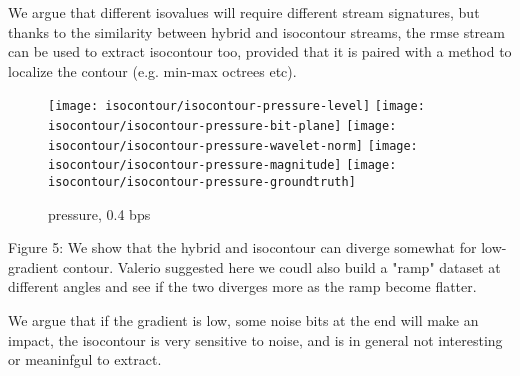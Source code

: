 We argue that different isovalues will require different stream signatures, but thanks to the
similarity between hybrid and isocontour streams, the rmse stream can be used to extract isocontour
too, provided that it is paired with a method to localize the contour (e.g. min-max octrees etc).

\begin{figure}[h]
	\centering
	{\texttt{[image: isocontour/isocontour-pressure-level]}}
	{\texttt{[image: isocontour/isocontour-pressure-bit-plane]}}
	{\texttt{[image: isocontour/isocontour-pressure-wavelet-norm]}}
	{\texttt{[image: isocontour/isocontour-pressure-magnitude]}}
	{\texttt{[image: isocontour/isocontour-pressure-groundtruth]}}
	\caption{pressure, 0.4 bps}
	\label{fig:isocontour-plots}
\end{figure}
Figure 5: We show that the hybrid and isocontour can diverge somewhat for low-gradient contour.
Valerio suggested here we coudl also build a "ramp" dataset at different angles and see if the two
diverges more as the ramp become flatter.

We argue that if the gradient is low, some noise bits at the end will make an impact, the isocontour
is very sensitive to noise, and is in general not interesting or meaninfgul to extract.
